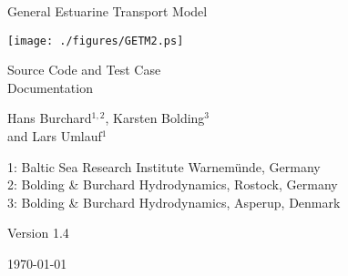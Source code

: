 \documentclass[a4paper,twoside]{article}
\begin{document}
\begin{titlepage}

\vfill

{\sf \bf \huge
 \begin{center}
   General Estuarine Transport Model
 \end{center}
}
\begin{center}
\texttt{[image: ./figures/GETM2.ps]}
\end{center}

\vspace{6mm}

{\sf \bf \LARGE
 \begin{center}
   Source Code and Test Case \\ Documentation
 \end{center}
}

{\sf \bf \LARGE
 \begin{center}
Hans Burchard$^{1,2}$, Karsten Bolding$^3$\\ and Lars Umlauf$^1$   
 \end{center}
}


\vspace{6mm}

{\sf \bf \Large
 \begin{center}
 1: Baltic Sea Research Institute Warnem\"unde, Germany \\
 2: Bolding \& Burchard Hydrodynamics, Rostock, Germany \\
 3: Bolding \& Burchard Hydrodynamics, Asperup, Denmark
 \end{center}
}


\vspace{5mm}

{\sf \bf \Large
 \begin{center}
  Version 1.4
 \end{center}
}

\vfill


{\sf \bf \Large
 \begin{center}
\today
 \end{center}
}

\vfill

\end{titlepage}


\cleardoublepage
\tableofcontents


\cleardoublepage
\end{document}
